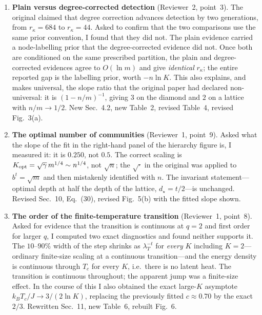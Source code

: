 \documentclass[11pt]{article}
\newcommand{\rk}{r_{\kappa}}
\begin{document}
\begin{enumerate}
\item \textbf{Plain versus degree-corrected detection}
      (Reviewer~2, point~3). The original claimed that degree correction
      advances detection by two generations, from $\rk=684$ to $\rk=44$. Asked
      to confirm that the two comparisons use the same prior convention, I
      found that they did not. The plain evidence carried a node-labelling
      prior that the degree-corrected evidence did not. Once both are
      conditioned on the same prescribed partition, the plain and
      degree-corrected evidences agree to $O(\ln m)$ and give
      \emph{identical} $\rk$; the entire reported gap is the labelling prior,
      worth $-n\ln K$. This also explains, and makes universal, the slope ratio
      that the original paper had declared non-universal: it is $(1-n/m)^{-1}$,
      giving $3$ on the diamond and $2$ on a lattice with $n/m\to1/2$. New
      Sec.~4.2, new Table~2, revised Table~4, revised Fig.~3(a).

\item \textbf{The optimal number of communities} (Reviewer~1, point~9). Asked
      what the slope of the fit in the right-hand panel of the hierarchy figure
      is, I measured it: it is $0.250$, not $0.5$. The correct scaling is
      $K_{\rm opt}=\sqrt{\gamma}\,m^{1/4}\sim n^{1/4}$, not $\sqrt{n}$; the
      $\sqrt{\cdot}$ in the original was applied to $b^t=\sqrt{m}$ and then
      mistakenly identified with $n$. The invariant statement---optimal depth
      at half the depth of the lattice, $d_\star=t/2$---is unchanged. Revised
      Sec.~10, Eq.~(30), revised Fig.~5(b) with the fitted slope shown.

\item \textbf{The order of the finite-temperature transition} (Reviewer~1,
      point~8). Asked for evidence that the transition is continuous at $q=2$
      and first order for larger $q$, I computed two exact diagnostics and
      found neither supports it. The $10$--$90\%$ width of the step shrinks as
      $\lambda_T^{-t}$ for \emph{every} $K$ including $K=2$---ordinary
      finite-size scaling at a continuous transition---and the energy density
      is continuous through $T_c$ for every $K$, i.e.\ there is no latent heat.
      The transition is continuous throughout; the apparent jump was a
      finite-size effect. In the course of this I also obtained the exact
      large-$K$ asymptote $k_BT_c/J\to3/(2\ln K)$, replacing the previously
      fitted $c\approx0.70$ by the exact $2/3$. Rewritten Sec.~11, new Table~6,
      rebuilt Fig.~6.
\end{enumerate}
\end{document}

